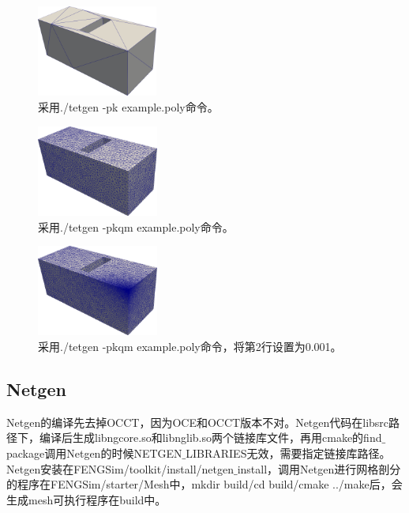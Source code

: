 \begin{figure}[!htbp]
  \centering
  \includegraphics[height=3cm]{fig/1/19.png}
  \caption{采用./tetgen -pk example.poly命令。}
  \label{fig:1-7}
\end{figure}

\begin{figure}[!htbp]
  \centering
  \includegraphics[height=3cm]{fig/1/17.png}
  \caption{采用./tetgen -pkqm example.poly命令。}
  \label{fig:1-7}
\end{figure}

\begin{figure}[!htbp]
  \centering
  \includegraphics[height=3cm]{fig/1/18.png}
  \caption{采用./tetgen -pkqm example.poly命令，将第2行设置为0.001。}
  \label{fig:1-7}
\end{figure}


\subsection{Netgen}

Netgen的编译先去掉OCCT，因为OCE和OCCT版本不对。Netgen代码在libsrc路径下，编译后生成libngcore.so和libnglib.so两个链接库文件，再用cmake的find$\_$package调用Netgen的时候NETGEN$\_$LIBRARIES无效，需要指定链接库路径。Netgen安装在FENGSim/toolkit/install/netgen$\_$install，调用Netgen进行网格剖分的程序在FENGSim/starter/Mesh中，mkdir build/cd build/cmake ../make后，会生成mesh可执行程序在build中。
